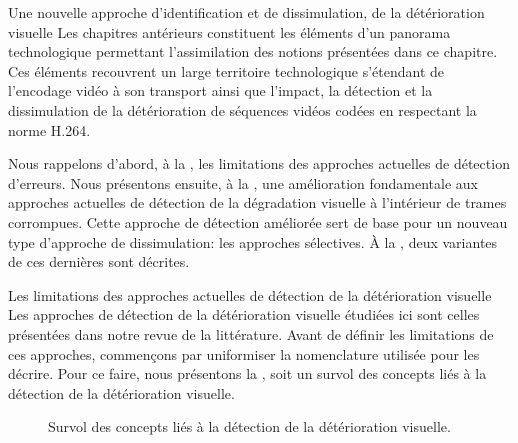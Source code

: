 \begin{chapter}{Une nouvelle approche d'identification et de dissimulation, de
la détérioration visuelle}
\label{chap-mcb}
Les chapitres antérieurs constituent les éléments d'un panorama technologique
permettant l'assimilation des notions présentées dans ce chapitre. Ces éléments
recouvrent un large territoire technologique s'étendant de l'encodage vidéo à
son transport ainsi que l'impact, la détection et la dissimulation de la
détérioration de séquences vidéos codées en respectant la norme H.264.

Nous rappelons d'abord, à la , les limitations des
approches actuelles de détection d'erreurs. Nous présentons ensuite, à la
, une amélioration fondamentale aux approches actuelles de
détection de la dégradation visuelle à l'intérieur de trames corrompues. Cette
approche de détection améliorée sert de base pour un nouveau type d'approche de
dissimulation: les approches sélectives. À la , deux
variantes de ces dernières sont décrites.

\begin{section}{Les limitations des approches actuelles de détection de la
détérioration visuelle}
\label{sect-limitations}
Les approches de détection de la détérioration visuelle étudiées ici sont celles
présentées dans notre revue de la littérature. Avant de définir les limitations
de ces approches, commençons par uniformiser la nomenclature utilisée pour les
décrire. Pour ce faire, nous présentons la , soit un survol des
concepts liés à la détection de la détérioration visuelle.

\begin{figure}
	\caption[Survol des concepts liés à la détection de la détérioration
visuelle]{Survol des concepts liés à la détection de la détérioration
visuelle.}
	\label{fig-System}
\end{figure}


\end{section}
\end{chapter}

